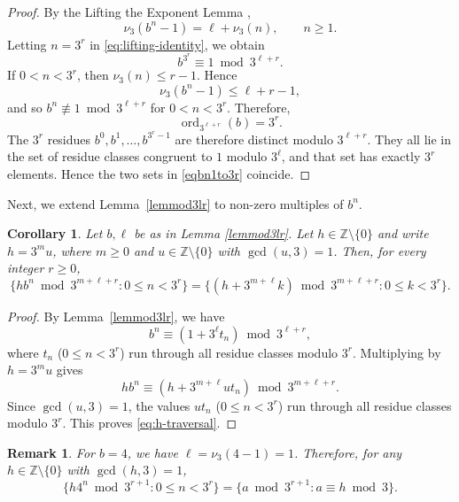 \documentclass[10pt,a4paper]{amsart}
\numberwithin{equation}{section} %
\DeclareMathOperator{\ord}{ord}
\newtheorem{cor}[thm]{Corollary}
\newtheorem{rem}[thm]{Remark}
\newcommand{\Z}{\mathbb{Z}}
\begin{document}
\begin{proof}
	By the Lifting the Exponent Lemma \cite[Theorem 1.37]{Pongsriiam},
	\begin{equation}\label{eq:lifting-identity}
		\nu_3(b^n-1)=\ell+\nu_3(n),
		\qquad n\ge 1.
	\end{equation}
	Letting $n=3^r$ in \eqref{eq:lifting-identity},  we obtain
	\[
	b^{3^r}\equiv 1 \bmod{3^{\ell+r}}.
	\]
	If $0<n<3^r$, then $\nu_3(n)\leq r-1$. Hence
	\[
	\nu_3(b^n-1)\leq \ell+r-1,\]
	and so $b^n\not\equiv 1\bmod {3^{\ell+r}}$ for $0<n<3^r$.  Therefore,
\begin{equation*}
		\ord_{3^{\ell+r}}(b)=3^r.
	\end{equation*}
	The $3^r$ residues $b^0,b^1,\ldots,b^{3^r-1}$ are therefore distinct modulo $3^{\ell+r}$.  They all lie in the set of residue classes congruent to $1$ modulo $3^\ell$, and that set has exactly $3^r$ elements.  Hence the two sets in \eqref{eqbn1to3r} coincide.
\end{proof}

Next, we extend  Lemma~\ref{lemmod3lr} to non-zero multiples of $b^n$. 

\begin{cor}\label{corhbnmod}
	Let $b,\ell$ be as in Lemma \ref{lemmod3lr}. Let $h\in\Z\setminus\{0\}$ and write $
	h=3^m u$, where $m\geq 0$ and $u\in\Z\setminus\{0\}$ with $ \gcd(u,3)=1$. Then, for every integer $r\ge 0$,
\begin{equation}\label{eq:h-traversal}
		\{h b^n\bmod{3^{m+\ell+r}}: 0\leq n<3^r\}
		=
		\{(h+3^{m+\ell}k)\bmod{3^{m+\ell+r}}:0\leq k<3^r\}.
	\end{equation}
	\end{cor}

\begin{proof} 
	By Lemma~\ref{lemmod3lr}, we have
	\[
	b^n\equiv (1+3^\ell t_n) \bmod {3^{\ell+r}},
	\]
where $t_n$ ($0\leq n<3^r$) run through all residue classes modulo $3^r$. 
	Multiplying by $h=3^m u$ gives
	\[
	h b^n \equiv (h + 3^{m+\ell}ut_n)
	\bmod{3^{m+\ell+r}}.
	\]
	Since $\gcd(u,3)=1$,  the values $ut_n$ ($0\leq n<3^r$) run through all residue classes modulo $3^r$.  This proves \eqref{eq:h-traversal}.  
\end{proof}

\begin{rem}\label{remb4case}
	For $b=4$, we  have $\ell=\nu_3(4-1)=1$.  Therefore, for any $h\in\Z\setminus\{0\}$ with $\gcd(h,3)=1$,
	\begin{equation*}
		\{h4^n \bmod 3^{r+1}:0\leq n<3^r\}
		=
		\{a\bmod{3^{r+1}}:a\equiv h\bmod{3}\}.
	\end{equation*}
\end{rem}
\end{document}
